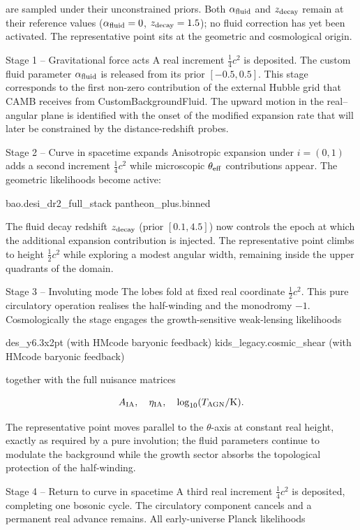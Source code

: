 are sampled under their unconstrained priors. Both \(\alpha_{\rm fluid}\) and \(z_{\rm decay}\) remain at their reference values (\(\alpha_{\rm fluid}=0\), \(z_{\rm decay}=1.5\)); no fluid correction has yet been activated. The representative point sits at the geometric and cosmological origin.

Stage 1 – Gravitational force acts
A real increment \(\frac14 c^2\) is deposited.  
The custom fluid parameter \(\alpha_{\rm fluid}\) is released from its prior \([-0.5,0.5]\). This stage corresponds to the first non-zero contribution of the external Hubble grid that CAMB receives from CustomBackgroundFluid. The upward motion in the real–angular plane is identified with the onset of the modified expansion rate that will later be constrained by the distance-redshift probes.

Stage 2 – Curve in spacetime expands
Anisotropic expansion under \(i=(0,1)\) adds a second increment \(\frac14 c^2\) while microscopic \(\theta_{\rm eff}\) contributions appear.  
The geometric likelihoods become active:

bao.desi_dr2_full_stack
pantheon_plus.binned

The fluid decay redshift \(z_{\rm decay}\) (prior \([0.1,4.5]\)) now controls the epoch at which the additional expansion contribution is injected. The representative point climbs to height \(\frac12 c^2\) while exploring a modest angular width, remaining inside the upper quadrants of the domain.

Stage 3 – Involuting mode
The lobes fold at fixed real coordinate \(\frac12 c^2\).  
This pure circulatory operation realises the half-winding and the monodromy \(-1\). Cosmologically the stage engages the growth-sensitive weak-lensing likelihoods

des_y6.3x2pt (with HMcode baryonic feedback)
kids_legacy.cosmic_shear (with HMcode baryonic feedback)

together with the full nuisance matrices

\[
A_{\rm IA},\quad\eta_{\rm IA},\quad\log_{10}(T_{\rm AGN}/{\rm K}).
\]

The representative point moves parallel to the \(\theta\)-axis at constant real height, exactly as required by a pure involution; the fluid parameters continue to modulate the background while the growth sector absorbs the topological protection of the half-winding.

Stage 4 – Return to curve in spacetime
A third real increment \(\frac14 c^2\) is deposited, completing one bosonic cycle.  
The circulatory component cancels and a permanent real advance remains. All early-universe Planck likelihoods


